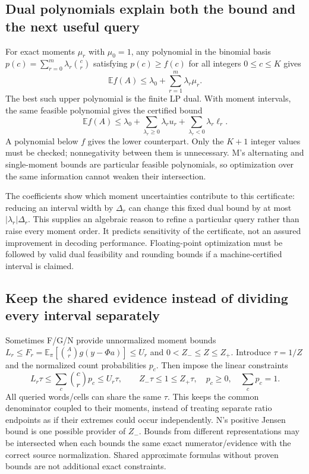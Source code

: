 \documentclass[10pt,a4paper]{article}
\newcommand{\E}{\mathbb E}
\begin{document}
\subsection{Dual polynomials explain both the bound and the next useful query}
For exact moments $\mu_r$ with $\mu_0=1$, any polynomial in the binomial basis
$p(c)=\sum_{r=0}^m\lambda_r\binom cr$ satisfying $p(c)\geq f(c)$ for all integers $0\leq c\leq K$ gives
\[
 \E f(A)\leq\lambda_0+\sum_{r=1}^m\lambda_r\mu_r.
\]
The best such upper polynomial is the finite LP dual. With moment intervals, the same feasible polynomial
gives the certified bound
\begin{equation}
 \E f(A)\leq\lambda_0+
       \sum_{\lambda_r\geq0}\lambda_r u_r+
       \sum_{\lambda_r<0}\lambda_r\ell_r.
 \label{eq:moment-dual-interval}
\end{equation}
A polynomial below $f$ gives the lower counterpart. Only the $K+1$ integer values must be checked;
nonnegativity between them is unnecessary. M's alternating and single-moment bounds are particular
feasible polynomials, so optimization over the same information cannot weaken their intersection.

The coefficients show which moment uncertainties contribute to this certificate: reducing an interval
width by $\Delta_r$ can change this fixed dual bound by at most $|\lambda_r|\Delta_r$.
This supplies an algebraic reason to refine a particular query rather than raise every moment order.
It predicts sensitivity of the certificate, not an assured improvement in decoding performance.
Floating-point optimization must be followed by valid dual feasibility and rounding bounds if a
machine-certified interval is claimed.

\subsection{Keep the shared evidence instead of dividing every interval separately}
Sometimes F/G/N provide unnormalized moment bounds
$L_r\leq F_r=\E_\pi[\binom Ar g(y-\Phi a)]\leq U_r$ and
$0<Z_-\leq Z\leq Z_+$. Introduce $\tau=1/Z$ and the normalized count probabilities $p_c$.
Then impose the linear constraints
\begin{equation}
 L_r\tau\leq\sum_c\binom crp_c\leq U_r\tau,\qquad
 Z_-\tau\leq1\leq Z_+\tau,\quad p_c\geq0,\quad\sum_cp_c=1.
 \label{eq:moment-shared-evidence}
\end{equation}
All queried words/cells can share the same $\tau$. This keeps the common denominator coupled to their
moments, instead of treating separate ratio endpoints as if their extremes could occur independently.
N's positive Jensen bound is one possible provider of $Z_-$. Bounds from different representations may
be intersected when each bounds the same exact numerator/evidence with the correct source normalization.
Shared approximate formulas without proven bounds are not additional exact constraints.
\end{document}
